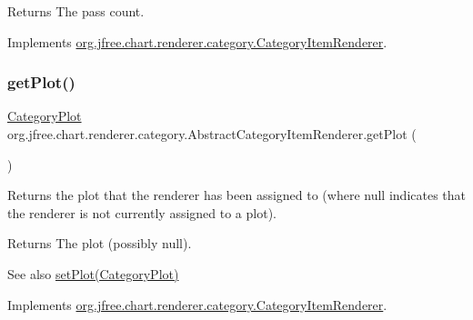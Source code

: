 \begin{DoxyReturn}{Returns}
The pass count. 
\end{DoxyReturn}


Implements \mbox{\hyperlink{interfaceorg_1_1jfree_1_1chart_1_1renderer_1_1category_1_1_category_item_renderer_aa8cd580a0e3836808f97f479f2c999bc}{org.\+jfree.\+chart.\+renderer.\+category.\+Category\+Item\+Renderer}}.

\mbox{\label{classorg_1_1jfree_1_1chart_1_1renderer_1_1category_1_1_abstract_category_item_renderer_a83ebcad71dce7b3494225aa077667296}} 
\subsubsection{\texorpdfstring{get\+Plot()}{getPlot()}}
{\footnotesize\ttfamily \mbox{\hyperlink{classorg_1_1jfree_1_1chart_1_1plot_1_1_category_plot}{Category\+Plot}} org.\+jfree.\+chart.\+renderer.\+category.\+Abstract\+Category\+Item\+Renderer.\+get\+Plot (\begin{DoxyParamCaption}{ }\end{DoxyParamCaption})}

Returns the plot that the renderer has been assigned to (where {\ttfamily null} indicates that the renderer is not currently assigned to a plot).

\begin{DoxyReturn}{Returns}
The plot (possibly {\ttfamily null}).
\end{DoxyReturn}
\begin{DoxySeeAlso}{See also}
\mbox{\hyperlink{classorg_1_1jfree_1_1chart_1_1renderer_1_1category_1_1_abstract_category_item_renderer_ace23a8e40019e23cde2ff8e729bb36a0}{set\+Plot(\+Category\+Plot)}} 
\end{DoxySeeAlso}


Implements \mbox{\hyperlink{interfaceorg_1_1jfree_1_1chart_1_1renderer_1_1category_1_1_category_item_renderer_a4e97e71b2fb7754a580bf9c29312a9db}{org.\+jfree.\+chart.\+renderer.\+category.\+Category\+Item\+Renderer}}.

